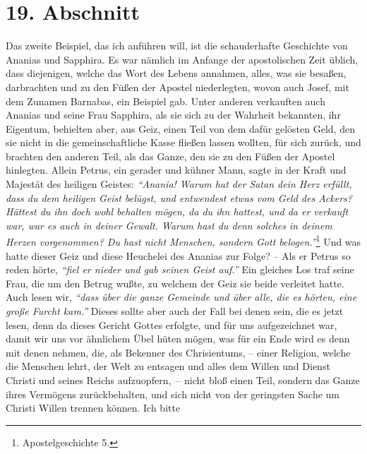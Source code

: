 \section{19. Abschnitt} \label{kap13_ab19}

 Das zweite Beispiel, das ich anführen will, ist die
schauderhafte Geschichte von
Ananias und Sapphira. Es war
nämlich im Anfange der apostolischen Zeit
üblich, dass diejenigen, welche das Wort des Lebens annahmen, alles, was
sie besaßen, darbrachten und zu den Füßen der Apostel niederlegten, wovon auch
Josef, mit dem Zunamen Barnabas, ein Beispiel gab. Unter anderen verkauften auch
Ananias und seine Frau Sapphira, als sie sich zu der Wahrheit bekannten, ihr
Eigentum, behielten aber, aus Geiz, einen Teil von dem dafür gelösten Geld,
den sie nicht in die gemeinschaftliche Kasse fließen lassen wollten, für sich
zurück, und brachten den anderen Teil, als das Ganze, den sie zu den Füßen der
Apostel hinlegten. Allein Petrus, ein gerader und kühner Mann, sagte in der
Kraft und Majestät des heiligen Geistes:
\textit{"`Anania! Warum hat der Satan dein Herz
erfüllt, dass du dem heiligen Geist belügst, und entwendest etwas vom Geld des
Ackers? Hättest du ihn doch wohl behalten mögen, da du ihn hattest, und da er
verkauft war, war es auch in deiner Gewalt. Warum hast du denn solches in deinem
Herzen vorgenommen? Du hast nicht Menschen, sondern Gott belogen."'}\footnote{Apostelgeschichte 5.}
Und was hatte dieser Geiz und diese Heuchelei des Ananias zur
Folge?
-- Als er Petrus so reden hörte,
\textit{"`fiel er nieder und gab seinen Geist auf."'}
Ein gleiches Los traf seine Frau, die um den Betrug wußte, zu welchem der Geiz
sie beide verleitet hatte. Auch lesen wir,
\textit{"`dass über die ganze Gemeinde und über
alle, die es hörten, eine große Furcht kam."'}
Dieses sollte aber auch der Fall
bei denen sein, die es jetzt lesen, denn da dieses Gericht Gottes
erfolgte, und
für uns aufgezeichnet war, damit wir uns vor ähnlichem Übel hüten mögen, was
für ein Ende wird es denn mit denen nehmen, die, als Bekenner des
Chrisientums, -- einer Religion,
welche die Menschen lehrt, der Welt zu
entsagen und alles dem Willen und Dienst Christi und
seines Reichs aufzuopfern,~-- nicht bloß einen Teil, sondern das Ganze ihres Vermögens zurückbehalten, und
sich nicht von der geringsten Sache um Christi Willen trennen können. Ich bitte
